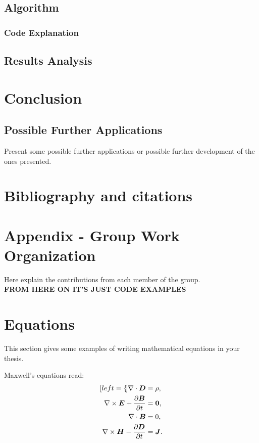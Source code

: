 \documentclass[11pt,a4paper]{article}
\begin{document}
\subsection{Algorithm}
\subsubsection{Code Explanation}
\subsection{Results Analysis}
\section{Conclusion}
\subsection{Possible Further Applications}
Present some possible further applications or possible further development of the ones presented.

\section{Bibliography and citations}

\section{Appendix - Group Work Organization}
Here explain the contributions from each member of the group.\\
\textbf{FROM HERE ON IT'S JUST CODE EXAMPLES}
\section{Equations}
\label{sec:eqs}
This section gives some examples of writing mathematical equations in your thesis.

Maxwell's equations read:
\begin{subequations}
    \label{eq:maxwell}
    \begin{align}[left=\empheqlbrace]
        \nabla\cdot \bm{D}                                         & = \rho, \label{eq:maxwell1}   \\
        \nabla \times \bm{E} +  \frac{\partial \bm{B}}{\partial t} & = \bm{0}, \label{eq:maxwell2} \\
        \nabla\cdot \bm{B}                                         & = 0, \label{eq:maxwell3}      \\
        \nabla \times \bm{H} - \frac{\partial \bm{D}}{\partial t}  & = \bm{J}. \label{eq:maxwell4}
    \end{align}
\end{subequations}
\end{document}
